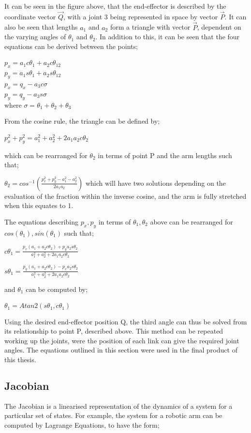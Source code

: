 \documentclass[12pt,openany,a4paper]{book}
\begin{document}
It can be seen in the figure above, that the end-effector is described by the coordinate vector $\vec{Q}$, with a joint 3 being represented in space by vector $\vec{P}$. It can also be seen that lengths $a_1$ and $a_2$ form a triangle with vector $\vec{P}$, dependent on the varying angles of $\theta_1$ and $\theta_2$. In addition to this, it can be seen that the four equations can be derived between the points;

$p_x = a_1 c\theta_1 + a_2 c \theta_{12}$\\
$p_y = a_1 s\theta_1 + a_2 s \theta_{12}$\\
$p_x = q_x - a_3 c\sigma$\\
$p_y = q_y - a_3 s\sigma$\\

where $\sigma = \theta_1 + \theta_2 + \theta_3$

From the cosine rule, the triangle can be defined by;

$p_x^2 + p_y^2 = a_1^2 + a_2^2 + 2 a_1 a_2 c \theta_2$

which can be rearranged for $\theta_2$ in terms of point P and the arm lengths such that;

$\theta_2 = cos^{-1} ( \frac{p_x^2 + p_y^2 - a_1^2 - a_2^2 }{2 a_1 a_2} )$
which will have two solutions depending on the evaluation of the fraction within the inverse cosine, and the arm is fully stretched when this equates to 1.

The equations describing $p_x, p_y$ in terms of $\theta_1, \theta_2$ above can be rearranged for $cos(\theta_1), sin(\theta_1)$ such that;

$c \theta_1 = \frac{p_x (a_1 + a_2 c \theta_2 ) + p_y a_2 s \theta_2}{a_1^2 + a_2^2 + 2 a_1 a_2 c \theta_2}$

$s \theta_1 = \frac{p_y (a_1 + a_2 c \theta_2 ) - p_x a_2 s \theta_2}{a_1^2 + a_2^2 + 2 a_1 a_2 c \theta_2}$

and $\theta_1$ can be computed by;

$\theta_1 = Atan2(s\theta_1, c\theta_1)$

Using the desired end-effector position Q, the third angle can thus be solved from its relationship to point P, described above. This method can be repeated working up the joints, were the position of each link can give the required joint angles. The equations outlined in this section were used in the final product of this thesis.


\subsection{Jacobian}
The Jacobian is a linearised representation of the dynamics of a system for a particular set of states. For example, the system for a robotic arm can be computed by Lagrange Equations, to have the form;
\end{document}
